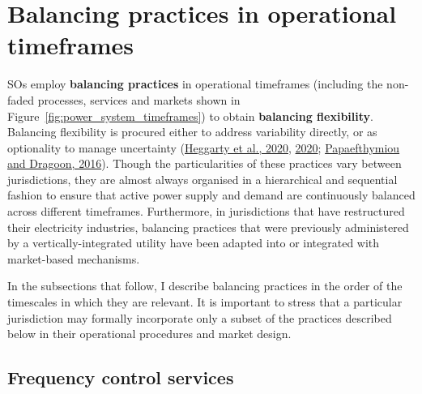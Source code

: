 \documentclass[12pt,a4paper,]{report}
\begin{document}
\hypertarget{sec:lit_review-balancing_practices}{%
\section{Balancing practices in operational
timeframes}\label{sec:lit_review-balancing_practices}}

SOs employ \textbf{balancing practices} in operational timeframes
(including the non-faded processes, services and markets shown in
Figure~\ref{fig:power_system_timeframes}) to obtain \textbf{balancing
flexibility}. Balancing flexibility is procured either to address
variability directly, or as optionality to manage uncertainty
(\protect\hyperlink{ref-heggartyQuantifyingPowerSystem2020}{Heggarty et
al., 2020},
\protect\hyperlink{ref-heggartyQuantifyingPowerSystem2020}{2020};
\protect\hyperlink{ref-papaefthymiou100RenewableEnergy2016}{Papaefthymiou
and Dragoon, 2016}). Though the particularities of these practices vary
between jurisdictions, they are almost always organised in a
hierarchical and sequential fashion to ensure that active power supply
and demand are continuously balanced across different timeframes.
Furthermore, in jurisdictions that have restructured their electricity
industries, balancing practices that were previously administered by a
vertically-integrated utility have been adapted into or integrated with
market-based mechanisms.

In the subsections that follow, I describe balancing practices in the
order of the timescales in which they are relevant. It is important to
stress that a particular jurisdiction may formally incorporate only a
subset of the practices described below in their operational procedures
and market design.

\hypertarget{sec:lit_review-balancing_practices-fcs}{%
\subsection{Frequency control
services}\label{sec:lit_review-balancing_practices-fcs}}
\end{document}
